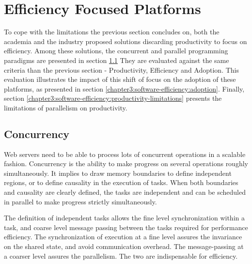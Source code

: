 \section{Efficiency Focused Platforms} \label{chapter3:software-efficiency}

To cope with the limitations the previous section concludes on, both the academia and the industry proposed solutions discarding productivity to focus on efficiency.
Among these solutions, the concurrent and parallel programming paradigms are presented in section \ref{chapter3:software-efficiency:concurrency}
They are evaluated against the same criteria than the previous section - Productivity, Efficiency and Adoption.
This evaluation illustrates the impact of this shift of focus on the adoption of these platforms, as presented in section \ref{chapter3:software-efficiency:adoption}.
Finally, section \ref{chapter3:software-efficiency:productivity-limitations} presents the limitations of parallelism on productivity.

\subsection{Concurrency} \label{chapter3:software-efficiency:concurrency}

\begin{figure}[h!]
%
\end{figure}

Web servers need to be able to process lots of concurrent operations in a scalable fashion.
Concurrency is the ability to make progress on several operations roughly simultaneously.
It implies to draw memory boundaries to define independent regions, or to define causality in the execution of tasks.
When both boundaries and causality are clearly defined, the tasks are independent and can be scheduled in parallel to make progress strictly simultaneously.

The definition of independent tasks allows the fine level synchronization within a task, and coarse level message passing between the tasks required for performance efficiency.
The synchronization of execution at a fine level assures the invariance on the shared state, and avoid communication overhead.
The message-passing at a coarser level assures the parallelism.
The two are indispensable for efficiency.

